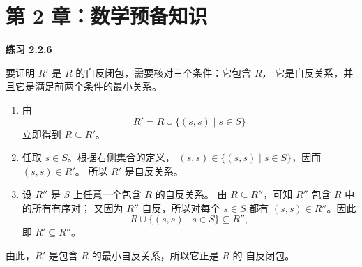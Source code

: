 \section*{第 2 章：数学预备知识}

\begin{taplsolutionentrybox}
\label{sol:translator:2.2.6}
\textbf{练习 2.2.6}

要证明 \(R'\) 是 \(R\) 的自反闭包，需要核对三个条件：它包含 \(R\)，
它是自反关系，并且它是满足前两个条件的最小关系。

\begin{enumerate}[label=\textup{(\arabic*)},leftmargin=2.2em]
  \item 由
  \[
    R'=R\cup\{(s,s)\mid s\in S\}
  \]
  立即得到 \(R\subseteq R'\)。

  \item 任取 \(s\in S\)。根据右侧集合的定义，
  \((s,s)\in\{(s,s)\mid s\in S\}\)，因而 \((s,s)\in R'\)。
  所以 \(R'\) 是自反关系。

  \item 设 \(R''\) 是 \(S\) 上任意一个包含 \(R\) 的自反关系。
  由 \(R\subseteq R''\)，可知 \(R''\) 包含 \(R\) 中的所有有序对；
  又因为 \(R''\) 自反，所以对每个 \(s\in S\) 都有
  \((s,s)\in R''\)。因此
  \[
    R\cup\{(s,s)\mid s\in S\}\subseteq R'',
  \]
  即 \(R'\subseteq R''\)。
\end{enumerate}

由此，\(R'\) 是包含 \(R\) 的最小自反关系，所以它正是 \(R\) 的
自反闭包。

\end{taplsolutionentrybox}

